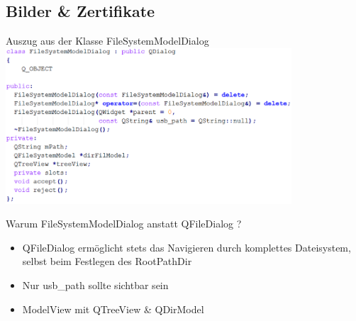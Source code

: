 \documentclass{beamer}
\begin{document}
\subsection{Bilder \& Zertifikate}
	\begin{frame}
		\centering
		    \Large Auszug aus der Klasse FileSystemModelDialog\\
		    \vspace{1em}
			\includegraphics[width=0.8\textwidth]{filesystemModelDialog.png}\\
	\end{frame}
	
	\begin{frame}
		\centering
		\Large Warum FileSystemModelDialog anstatt QFileDialog ?\\
		\vspace{1em}
		\begin{large}
			\begin{itemize}
				\item QFileDialog ermöglicht stets das Navigieren durch komplettes Dateisystem, selbst beim Festlegen des RootPathDir\\
                \vspace{1em}
				\item Nur usb\_path sollte sichtbar sein\\
                \vspace{1em}
				\item ModelView mit QTreeView \& QDirModel\\
			\end{itemize}
			
		\end{large}
	\end{frame}
	
\end{document}
